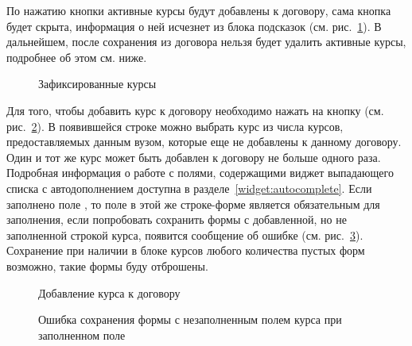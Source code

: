 По нажатию кнопки  активные курсы будут добавлены к договору, сама кнопка будет скрыта, информация о ней исчезнет из блока подсказок (см. рис.~\ref{agreement:edit_course_fixed}). В дальнейшем, после сохранения из договора нельзя будет удалить активные курсы, подробнее об этом см. ниже.
		
		\begin{figure}[H]
		\caption{Зафиксированные курсы}
		\label{agreement:edit_course_fixed}
		\end{figure}	

	Для того, чтобы добавить курс к договору необходимо нажать на кнопку (см. рис.~\ref{agreement:edit_course_add}). В появившейся строке можно выбрать курс из числа курсов, предоставляемых данным вузом, которые еще не добавлены к данному договору. Один и тот же курс может быть добавлен к договору не больше одного раза. Подробная информация о работе с полями, содержащими виджет выпадающего списка с автодополнением доступна в разделе~\ref{widget:autocomplete}. Если заполнено поле , то поле  в этой же строке-форме является обязательным для заполнения, если попробовать сохранить формы с добавленной, но не заполненной строкой курса, появится сообщение об ошибке (см. рис.~\ref{agreement:edit_course_required}). Сохранение при наличии в блоке курсов любого количества пустых форм возможно, такие формы буду отброшены.
		
		\begin{figure}[H]
		\caption{Добавление курса к договору}
		\label{agreement:edit_course_add}
		\end{figure}	
		
		\begin{figure}[H]
		\caption{Ошибка сохранения формы с незаполненным полем курса при заполненном поле }
		\label{agreement:edit_course_required}
		\end{figure}	
		
